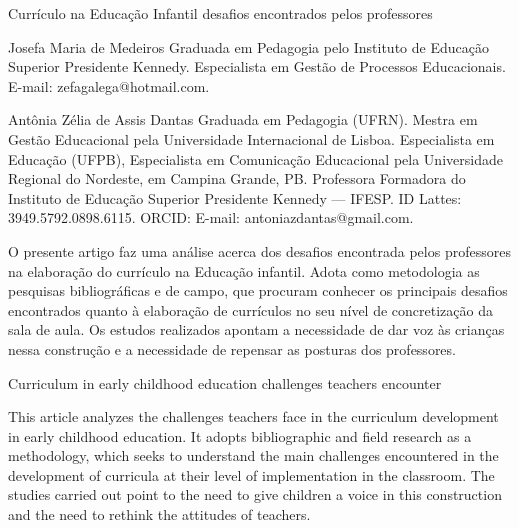 \begin{refsection}
    \renewcommand{\thefigure}{\arabic{figure}}
    
    \chapterTwoLines
    {Currículo na Educação Infantil}
    {desafios encontrados pelos professores}
    \label{chap:curriculo-ed-infant}

    \articleAuthor
    {Josefa Maria de Medeiros }
    {Graduada em Pedagogia pelo Instituto de Educação Superior Presidente Kennedy. Especialista em Gestão de Processos Educacionais. E-mail: zefa\textunderscore{}galega@hotmail.com.}
    
    \articleAuthor
    {Antônia Zélia de Assis Dantas}
    {Graduada em Pedagogia (UFRN). Mestra em Gestão Educacional pela Universidade Internacional de Lisboa. Especialista em Educação (UFPB), Especialista em Comunicação Educacional pela Universidade Regional do Nordeste, em Campina Grande, PB. Professora Formadora do Instituto de Educação Superior Presidente Kennedy --- IFESP. ID Lattes: 3949.5792.0898.6115. ORCID: E-mail: antoniazdantas@gmail.com.}
    
    \begin{galoResumo}
        O presente artigo faz uma análise acerca dos desafios encontrada pelos professores na elaboração do currículo na Educação infantil. Adota como metodologia as pesquisas bibliográficas e de campo, que procuram conhecer os principais desafios encontrados quanto à elaboração de currículos no seu nível de concretização da sala de aula. Os estudos realizados apontam a necessidade de dar voz às crianças nessa construção e a necessidade de repensar as posturas dos professores.
    \end{galoResumo}
    
    
    \begin{otherlanguage}{english}

    \fakeChapterTwoLines
    {Curriculum in early childhood education}
    {challenges teachers encounter}

    \begin{galoResumo}[Abstract]
        This article analyzes the challenges teachers face in the curriculum development in early childhood education. It adopts bibliographic and field research as a methodology, which seeks to understand the main challenges encountered in the development of curricula at their level of implementation in the classroom. The studies carried out point to the need to give children a voice in this construction and the need to rethink the attitudes of teachers. 
    \end{galoResumo}
    

\end{otherlanguage}
\end{refsection}
